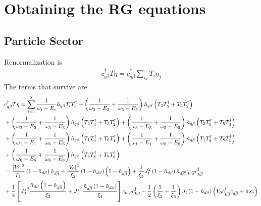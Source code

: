 \documentclass[12pt,twoside]{report}
\numberwithin{equation}{section}
\begin{document}
\section{Obtaining the RG equations}
\subsection{Particle Sector}
Renormalization is
\begin{equation}\begin{aligned}
	c^\dagger_{q\beta}T \eta = c^\dagger_{q\beta}\sum_{ij}T_i \eta_j
\end{aligned}\end{equation}
The terms that survive are
\begin{equation}\begin{aligned}
& c^\dagger_{q\beta}T \eta
= \sum_{i=1}^8\frac{1}{\omega_i - E_i}\hat n_{q\beta} T_i T_i^\dagger +\left(\frac{1}{\omega_2 - E_2} + \frac{1}{\omega_5 - E_5}\right)\hat n_{q\beta} \left(T_2 T_5^\dagger + T_5 T_2^\dagger \right) \\
& +\left(\frac{1}{\omega_2 - E_2} + \frac{1}{\omega_3 - E_3}\right)\hat n_{q\beta} \left(T_2 T_3^\dagger + T_3 T_2^\dagger \right) + \left(\frac{1}{\omega_3 - E_3} + \frac{1}{\omega_5 - E_5}\right)\hat n_{q\beta} \left(T_3 T_5^\dagger + T_5 T_3^\dagger \right) \\
& + \left(\frac{1}{\omega_1 - E_1} + \frac{1}{\omega_6 - E_6}\right)\hat n_{q\beta} \left(T_1 T_6^\dagger + T_6 T_1^\dagger \right) + \left(\frac{1}{\omega_1 - E_1} + \frac{1}{\omega_8 - E_8}\right)\hat n_{q\beta} \left(T_1 T_8^\dagger + T_8 T_1^\dagger \right) \\
& + \left(\frac{1}{\omega_6 - E_6} + \frac{1}{\omega_8 - E_8}\right)\hat n_{q\beta} \left(T_6 T_8^\dagger + T_8 T_6^\dagger \right)\\
&=\frac{|V_1|^2}{\xi_1}\left( 1 - \hat n_{d\beta} \right) \hat n_{d\ol\beta} + \frac{|V_0|^2}{\xi_2}\left( 1 - \hat n_{d\beta} \right) \left( 1 - \hat n_{d\ol\beta} \right) + \frac{1}{\xi_5}J_t^2 \left( 1 - \hat n_{d\beta} \right) \hat n_{d\ol\beta} c_{k^\prime\ol\beta}c^\dagger_{k\ol\beta} \\
&+ \frac{1}{4}\left[ {J_0^z}^2\frac{\hat n_{d\beta}\left( 1 - \hat n_{d\ol\beta} \right) }{\xi_3} + {J_1^z}^2\frac{\hat n_{d\ol\beta}\left( 1 - \hat n_{d\beta} \right)}{\xi_4} \right]c_{k^\prime\beta}c^\dagger_{k\beta} - \frac{1}{2} \left(\frac{1}{\xi_2} + \frac{1}{\xi_5}\right)J_t\left( 1 - \hat n_{d\beta}\right) \left(V_0 c^\dagger_{k\ol\beta}c_{d\ol\beta} + \text{h.c.}\right) \\

\end{aligned}
\end{equation}
\end{document}
